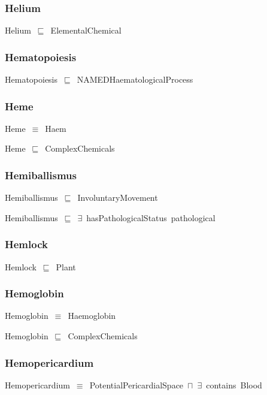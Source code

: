 \documentclass{article}
\begin{document}
\subsubsection*{Helium}

Helium~\ensuremath{\sqsubseteq}~ElementalChemical~

\subsubsection*{Hematopoiesis}

Hematopoiesis~\ensuremath{\sqsubseteq}~NAMEDHaematologicalProcess~

\subsubsection*{Heme}

Heme~\ensuremath{\equiv}~Haem

Heme~\ensuremath{\sqsubseteq}~ComplexChemicals~

\subsubsection*{Hemiballismus}

Hemiballismus~\ensuremath{\sqsubseteq}~InvoluntaryMovement~

Hemiballismus~\ensuremath{\sqsubseteq}~\ensuremath{\exists}~hasPathologicalStatus~pathological~

\subsubsection*{Hemlock}

Hemlock~\ensuremath{\sqsubseteq}~Plant~

\subsubsection*{Hemoglobin}

Hemoglobin~\ensuremath{\equiv}~Haemoglobin

Hemoglobin~\ensuremath{\sqsubseteq}~ComplexChemicals~

\subsubsection*{Hemopericardium}

Hemopericardium~\ensuremath{\equiv}~PotentialPericardialSpace~\ensuremath{\sqcap}~\ensuremath{\exists}~contains~Blood
\end{document}
